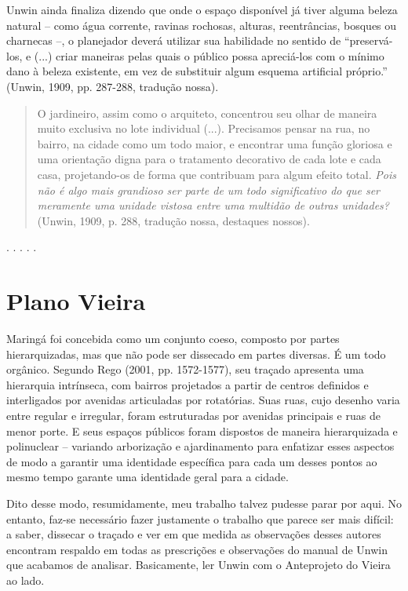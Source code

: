 \documentclass[12pt, a4paper]{book} %
\begin{document}
        Unwin ainda finaliza dizendo que onde o espaço disponível já tiver alguma beleza natural – como água corrente, ravinas rochosas, alturas, reentrâncias, bosques ou charnecas –, o planejador deverá utilizar sua habilidade no sentido de ``preservá-los, e (...) criar maneiras pelas quais o público possa apreciá-los com o mínimo dano à beleza existente, em vez de substituir algum esquema artificial próprio.'' (Unwin, 1909, pp. 287-288, tradução nossa).

        \begin{quotation}
            O jardineiro, assim como o arquiteto, concentrou seu olhar de maneira muito exclusiva no lote individual (...). Precisamos pensar na rua, no bairro, na cidade como um todo maior, e encontrar uma função gloriosa e uma orientação digna para o tratamento decorativo de cada lote e cada casa, projetando-os de forma que contribuam para algum efeito total. \textit{Pois não é algo mais grandioso ser parte de um todo significativo do que ser meramente uma unidade vistosa entre uma multidão de outras unidades?} (Unwin, 1909, p. 288, tradução nossa, destaques nossos).
        \end{quotation}
        

        \begin{center}
            . . . . .
        \end{center} 

            \section{Plano Vieira}

        Maringá foi concebida como um conjunto coeso, composto por partes hierarquizadas, mas que não pode ser dissecado em partes diversas. É um todo orgânico. Segundo Rego (2001, pp. 1572-1577), seu traçado apresenta uma hierarquia intrínseca, com bairros projetados a partir de centros definidos e interligados por avenidas articuladas por rotatórias. Suas ruas, cujo desenho varia entre regular e irregular, foram estruturadas por avenidas principais e ruas de menor porte. E seus espaços públicos foram dispostos de maneira hierarquizada e polinuclear – variando arborização e ajardinamento para enfatizar esses aspectos de modo a garantir uma identidade específica para cada um desses pontos ao mesmo tempo garante uma identidade geral para a cidade.

        Dito desse modo, resumidamente, meu trabalho talvez pudesse parar por aqui. No entanto, faz-se necessário fazer justamente o trabalho que parece ser mais difícil: a saber, dissecar o traçado e ver em que medida as observações desses autores encontram respaldo em todas as prescrições e observações do manual de Unwin que acabamos de analisar. Basicamente, ler Unwin com o Anteprojeto do Vieira ao lado.
\end{document}
